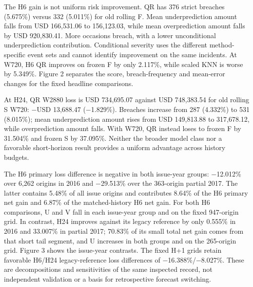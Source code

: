 \documentclass[10pt,a4paper]{article}
\begin{document}
The H6 gain is not uniform risk improvement. QR has 376 strict breaches (5.675\%) versus 332 (5.011\%) for old rolling F. Mean underprediction amount falls from USD 166,531.06 to 156,123.03, while mean overprediction amount falls by USD 920,830.41. More occasions breach, with a lower unconditional underprediction contribution. Conditional severity uses the different method-specific event sets and cannot identify improvement on the same incidents. At W720, H6 QR improves on frozen F by only 2.117\%, while scaled KNN is worse by 5.349\%. Figure 2 separates the score, breach-frequency and mean-error changes for the fixed headline comparisons.

At H24, QR W2880 loss is USD 734,695.07 against USD 748,383.54 for old rolling S W720: \(-\)USD 13,688.47 (\(-\)1.829\%). Breaches increase from 287 (4.332\%) to 531 (8.015\%); mean underprediction amount rises from USD 149,813.88 to 317,678.12, while overprediction amount falls. With W720, QR instead loses to frozen F by 31.504\% and frozen S by 37.095\%. Neither the broader model class nor a favorable short-horizon result provides a uniform advantage across history budgets.

The H6 primary loss difference is negative in both issue-year groups: \(-\)12.012\% over 6,262 origins in 2016 and \(-\)29.513\% over the 363-origin partial 2017. The latter contains 5.48\% of all issue origins and contributes 8.64\% of the H6 primary net gain and 6.87\% of the matched-history H6 net gain. For both H6 comparisons, U and V fall in each issue-year group and on the fixed 947-origin grid. In contrast, H24 improves against its legacy reference by only 0.555\% in 2016 and 33.007\% in partial 2017; 70.83\% of its small total net gain comes from that short tail segment, and U increases in both groups and on the 265-origin grid. Figure 3 shows the issue-year contrasts. The fixed H+1 grids retain favorable H6/H24 legacy-reference loss differences of \(-\)16.388\%/\(-\)8.027\%. These are decompositions and sensitivities of the same inspected record, not independent validation or a basis for retrospective forecast switching.
\end{document}
